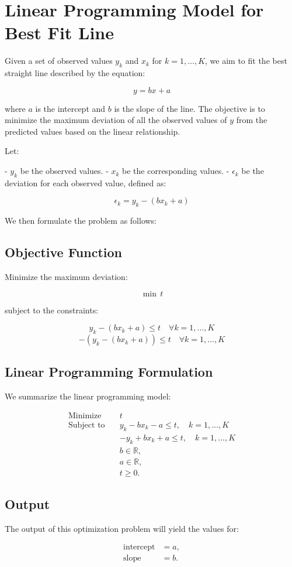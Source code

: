 \documentclass{article}
\begin{document}
\section*{Linear Programming Model for Best Fit Line}

Given a set of observed values \( y_k \) and \( x_k \) for \( k = 1, \ldots, K \), we aim to fit the best straight line described by the equation:

\[
y = bx + a
\]

where \( a \) is the intercept and \( b \) is the slope of the line. The objective is to minimize the maximum deviation of all the observed values of \( y \) from the predicted values based on the linear relationship.

Let:

- \( y_k \) be the observed values.
- \( x_k \) be the corresponding values.
- \( \epsilon_k \) be the deviation for each observed value, defined as:

\[
\epsilon_k = y_k - (bx_k + a)
\]

We then formulate the problem as follows:

\subsection*{Objective Function}

Minimize the maximum deviation:

\[
\min \, t
\]

subject to the constraints:

\[
y_k - (bx_k + a) \leq t \quad \forall k = 1, \ldots, K
\]
\[
-(y_k - (bx_k + a)) \leq t \quad \forall k = 1, \ldots, K
\]

\subsection*{Linear Programming Formulation}

We summarize the linear programming model:

\begin{align*}
\text{Minimize} \quad & t \\
\text{Subject to} \quad & y_k - bx_k - a \leq t, \quad k = 1, \ldots, K \\
& -y_k + bx_k + a \leq t, \quad k = 1, \ldots, K \\
& b \in \mathbb{R}, \\
& a \in \mathbb{R}, \\
& t \geq 0.
\end{align*}

\subsection*{Output}

The output of this optimization problem will yield the values for:

\begin{align*}
\text{intercept} & = a, \\
\text{slope} & = b.
\end{align*}
\end{document}
